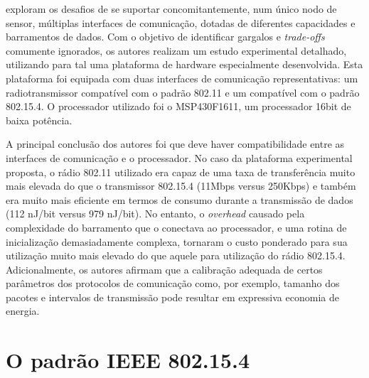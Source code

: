 \documentclass[
	12pt,				%
	openright,			%
	oneside,
	a4paper,			%
	english,			%
	french,				%
	spanish,			%
	brazil				%
	]{abntex2}
\begin{document}
 exploram os desafios de se suportar concomitantemente, num único nodo de sensor, múltiplas interfaces de comunicação, dotadas de diferentes capacidades e barramentos de dados. Com o objetivo de identificar gargalos e \textit{trade-offs} comumente ignorados, os autores realizam um estudo experimental detalhado, utilizando para tal uma plataforma de hardware especialmente desenvolvida. Esta plataforma foi equipada com duas interfaces de comunicação representativas: um radiotransmissor compatível com o padrão 802.11 e um compatível com o padrão 802.15.4. O processador utilizado foi o MSP430F1611, um processador 16bit de baixa potência.

A principal conclusão dos autores foi que deve haver compatibilidade entre as interfaces de comunicação e o processador. No caso da plataforma experimental proposta, o rádio 802.11 utilizado era capaz de uma taxa de transferência muito mais elevada do que o transmissor 802.15.4 (11Mbps versus 250Kbps) e também era muito mais eficiente em termos de consumo durante a transmissão  de dados (112 nJ/bit versus 979 nJ/bit). No entanto, o \textit{overhead} causado pela complexidade do barramento que o conectava ao processador, e uma rotina de inicialização demasiadamente complexa, tornaram o custo ponderado para sua utilização muito mais elevado do que aquele para utilização do rádio 802.15.4. Adicionalmente, os autores afirmam que a calibração adequada de certos parâmetros dos protocolos de comunicação como, por exemplo, tamanho dos pacotes e intervalos de transmissão pode resultar em expressiva economia de energia.

\chapter{O padrão IEEE 802.15.4}
\end{document}

